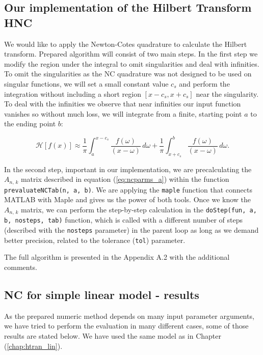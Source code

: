 \documentclass[12pt,twoside,a4paper]{article}
\numberwithin{equation}{subsection}
\numberwithin{figure}{subsection}
\begin{document}
\subsection{Our implementation of the Hilbert Transform HNC}  \label{chap:nc_hilbert_transform}

We would like to apply the Newton-Cotes quadrature to calculate the Hilbert transform. Prepared algorithm will consist of two
main steps. In the first step we modify the region under the integral to omit singularities and deal with infinities. To omit the
singularities as the NC quadrature was not designed to be used on singular functions, we will set a small constant value $c_s$ and
perform the integration without including a short region $[x - c_s, x + c_s]$ near the singularity. To deal with the infinities we observe
that near infinities our input function vanishes so without much loss, we will integrate from a finite, starting point $a$ to the ending
point $b$:

\begin{equation}
	\mathcal{H}[f(x)] \approx \frac{1}{\pi} \int_{ a }^{ x - c_s } \frac{ f(\omega) }{ (x - \omega) } \, d\omega 
                           +  \frac{1}{\pi} \int_{ x + c_s }^{ b } \frac{ f(\omega) }{ (x - \omega) } \, d\omega .
\end{equation} 

In the second step, important in our implementation, we are pre\-calculating the $A_{n, \, k}$ matrix described in equation
(\ref{eq:ncparms_a}) within the function \texttt{prevaluateNCTab(n, a, b)}. We are applying the \texttt{maple} function that connects MATLAB
with Maple and gives us the power of both tools. Once we know the $A_{n, \, k}$ matrix, we can perform the step-by-step calculation in the
\texttt{doStep(fun, a, b, nosteps, tab)} function, which is called with a different number of steps (described with the \texttt{nosteps}
parameter) in the parent loop as long as we demand better precision, related to the tolerance (\texttt{tol}) parameter.

The full algorithm is presented in the Appendix A.2 with the additional comments. 

\subsection{NC for simple linear model - results} \label{chap:nc_lin}

As the prepared numeric method depends on many input parameter arguments, we have tried to perform the evaluation in many different
cases, some of those results are stated below. We have used the same model as in Chapter (\ref{chap:htran_lin}).
\end{document}
